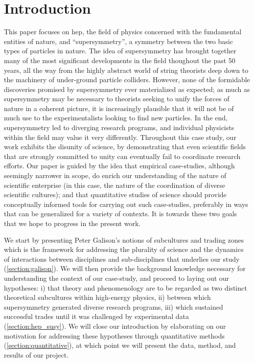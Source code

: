 \documentclass[smallextended]{svjour3}
\begin{document}


\section{Introduction}
\label{section:introduction}

This paper focuses on \gls{hep}, the field of physics concerned with the fundamental entities of nature, and ``supersymmetry'', a symmetry between the two basic types of particles in nature. The idea of supersymmetry has brought together many of the most significant developments in the field thoughout the past 50 years, all the way from the highly abstract world of string theorists deep down to the machinery of under-ground particle colliders. However, none of the formidable discoveries promised by supersymmetry ever materialized as expected; as much as supersymmetry may be necessary to theorists seeking to unify the forces of nature in a coherent picture, it is increasingly plausible that it will not be of much use to the experimentalists looking to find new particles. In the end, supersymmetry led to diverging research programs, and individual physicists within the field may value it very differently. Throughout this case study, our work exhibits the disunity of science, by demonstrating that even scientific fields that are strongly committed to unity can eventually fail to coordinate research efforts. Our paper is guided by the idea that empirical case-studies, although seemingly narrower in scope, do enrich our understanding of the nature of scientific enterprise (in this case, the nature of the coordination of diverse scientific cultures); and that quantitative studies of science should provide conceptually informed tools for carrying out such case-studies, preferably in ways that can be generalized for a variety of contexts. It is towards these two goals that we hope to progress in the present work. 

We start by presenting Peter Galison's notions of subcultures and trading zones which is the framework for addressing the plurality of science and the dynamics of interactions between disciplines and sub-disciplines that underlies our study 
(\ref{section:galison}). We will then provide the background knowledge necessary for understanding the context of our case-study, and proceed to laying out our hypotheses: i) that theory and phenomenology are to be regarded as two distinct theoretical subcultures within high-energy physics, ii) between which supersymmetry generated diverse research programs, iii) which sustained successful trades until it was challenged by experimental data (\ref{section:hep_susy}). We will close our introduction by elaborating on our motivation for addressing these hypotheses through quantitative methods (\ref{section:quantitative}), at which point we will present the data, method, and results of our project.
\end{document}
